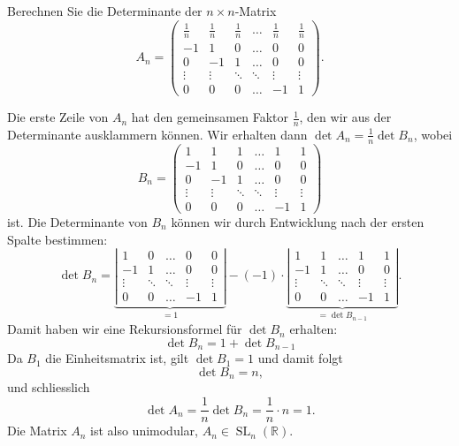 Berechnen Sie die Determinante der $n\times n$-Matrix 
\[
A_n=\begin{pmatrix}
\frac1n& \frac1n& \frac1n&\dots & \frac1n& \frac1n\\
     -1&       1&       0&\dots &       0&       0\\
      0&      -1&       1&\dots &       0&       0\\
\vdots &\vdots  &\ddots  &\ddots& \vdots & \vdots \\
      0&       0&       0&\dots &      -1&       1
\end{pmatrix}.
\]

\begin{loesung}
Die erste Zeile von $A_n$ hat den gemeinsamen Faktor $\frac1n$, den
wir aus der Determinante ausklammern können.
Wir erhalten dann $\det A_n =\frac1n\det B_n $, wobei 
\[
B_n=\begin{pmatrix}
      1&       1&       1&\dots &       1&       1\\
     -1&       1&       0&\dots &       0&       0\\
      0&      -1&       1&\dots &       0&       0\\
\vdots &\vdots  &\ddots  &\ddots& \vdots & \vdots \\
      0&       0&       0&\dots &      -1&       1
\end{pmatrix}
\]
ist.
Die Determinante von $B_n$ können wir durch Entwicklung nach der ersten
Spalte bestimmen:
\[
\det B_n
=
\underbrace{
\left|\begin{matrix}
       1&       0&\dots &       0&       0\\
      -1&       1&\dots &       0&       0\\
\vdots  &\ddots  &\ddots& \vdots & \vdots \\
       0&       0&\dots &      -1&       1
\end{matrix}\right|}_{=1}
-(-1)\cdot
\underbrace{
\left|\begin{matrix}
       1&       1&\dots &       1&       1\\
      -1&       1&\dots &       0&       0\\
\vdots  &\ddots  &\ddots& \vdots & \vdots \\
       0&       0&\dots &      -1&       1
\end{matrix}\right|}_{=\det B_{n-1}}.
\]
Damit haben wir eine Rekursionsformel für $\det B_n$ erhalten:
\[
\det B_n = 1 + \det B_{n-1}
\]
Da $B_1$ die Einheitsmatrix ist, gilt $\det B_1=1$ und damit folgt
\[
\det B_n=n,
\]
und schliesslich
\[
\det A_n=\frac1n\det B_n=\frac1n\cdot n=1.
\]
Die Matrix $A_n$ ist also unimodular, $A_n\in\operatorname{SL}_n(\mathbb R)$.
\end{loesung}

